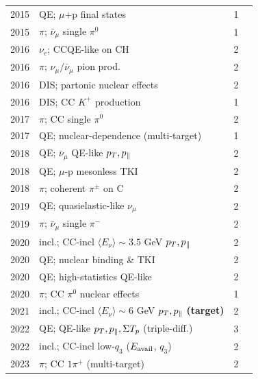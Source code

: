 {\begin{longtable}{@{}clcl@{}}
  2015 & QE; $\mu$+p final states                 & 1 & \cite{MINERvA:2015mup} \\
  2015 & $\pi$; $\bar\nu_\mu$ single $\pi^0$       & 1 & \cite{MINERvA:2015pi0} \\
  2016 & $\nu_e$; CCQE-like on CH                  & 2 & \cite{MINERvA:2016nueqe} \\
  2016 & $\pi$; $\nu_\mu/\bar\nu_\mu$ pion prod.   & 2 & \cite{MINERvA:2016pion} \\
  2016 & DIS; partonic nuclear effects            & 2 & \cite{MINERvA:2016dis} \\
  2016 & DIS; CC $K^+$ production                  & 1 & \cite{MINERvA:2016kaon} \\
  2017 & $\pi$; CC single $\pi^0$                  & 2 & \cite{MINERvA:2017pi0} \\
  2017 & QE; nuclear-dependence (multi-target)     & 1 & \cite{MINERvA:2017Adep} \\
  2018 & QE; $\bar\nu_\mu$ QE-like $p_{T},p_{\parallel}$     & 2 & \cite{MINERvA:2018hba} \\
  2018 & QE; $\mu$-p mesonless TKI                 & 2 & \cite{MINERvA:2018tcb} \\
  2018 & $\pi$; coherent $\pi^\pm$ on C            & 2 & \cite{MINERvA:2018coh} \\
  2019 & QE; quasielastic-like $\nu_\mu$           & 2 & \cite{MINERvA:2019qe} \\
  2019 & $\pi$; $\bar\nu_\mu$ single $\pi^-$       & 2 & \cite{MINERvA:2019pim} \\
  2020 & incl.; CC-incl $\langle E_\nu\rangle\!\sim\!3.5$ GeV $p_{T},p_{\parallel}$ & 2 & \cite{MINERvA:2020jwd} \\
  2020 & QE; nuclear binding \& TKI               & 2 & \cite{MINERvA:2020cgh} \\
  2020 & QE; high-statistics QE-like              & 2 & \cite{MINERvA:2020qehs} \\
  2020 & $\pi$; CC $\pi^0$ nuclear effects        & 1 & \cite{MINERvA:2020pi0} \\
  2021 & incl.; CC-incl $\langle E_\nu\rangle\!\sim\!6$ GeV $p_{T},p_{\parallel}$ \textbf{(target)} & 2 & \cite{MINERvA:2021owq} \\
  2022 & QE; QE-like $p_{T},p_{\parallel},\Sigma T_p$ (triple-diff.) & 3 & \cite{MINERvA:2022qelike3d} \\
  2022 & incl.; CC-incl low-$q_{3}$ ($E_{\mathrm{avail}}$, $q_{3}$) & 2 & \cite{MINERvA:2022incl} \\
  2023 & $\pi$; CC $1\pi^+$ (multi-target)        & 2 & \cite{MINERvA:2023ccpi} \\

\end{longtable}}

